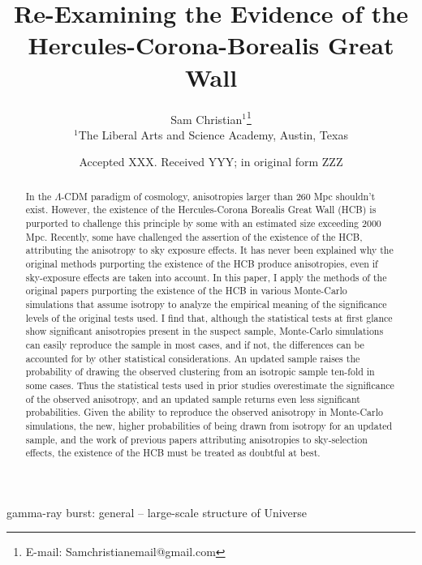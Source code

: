 \documentclass[fleqn,usenatbib]{mnras}
\title[Evidence of the HCB Great Wall]{Re-Examining the Evidence of the Hercules-Corona-Borealis Great Wall}
\author[S. Christian]{
Sam Christian$^{1}$\thanks{E-mail: Samchristianemail@gmail.com}
\\
$^{1}$The Liberal Arts and Science Academy, Austin, Texas\\
}
\date{Accepted XXX. Received YYY; in original form ZZZ}
\begin{document}
\label{firstpage}
\pagerange{\pageref{firstpage}--\pageref{lastpage}}
\maketitle

\begin{abstract}
In the $\Lambda$-CDM paradigm of cosmology, anisotropies larger than 260 Mpc shouldn't exist. However, the existence of the Hercules-Corona Borealis Great Wall (HCB) is purported to challenge this principle by some with an estimated size exceeding 2000 Mpc. Recently, some have challenged the assertion of the existence of the HCB, attributing the anisotropy to sky exposure effects. It has never been explained why the original methods purporting the existence of the HCB produce anisotropies, even if sky-exposure effects are taken into account. In this paper, I apply the methods of the original papers purporting the existence of the HCB in various Monte-Carlo simulations that assume isotropy to analyze the empirical meaning of the significance levels of the original tests used. I find that, although the statistical tests at first glance show significant anisotropies present in the suspect sample, Monte-Carlo simulations can easily reproduce the sample in most cases, and if not, the differences can be accounted for by other statistical considerations. An updated sample raises the probability of drawing the observed clustering from an isotropic sample ten-fold in some cases. Thus the statistical tests used in prior studies overestimate the significance of the observed anisotropy, and an updated sample returns even less significant probabilities. Given the ability to reproduce the observed anisotropy in Monte-Carlo simulations, the new, higher probabilities of being drawn from isotropy for an updated sample, and the work of previous papers attributing anisotropies to sky-selection effects, the existence of the HCB must be treated as doubtful at best.
\end{abstract}

\begin{keywords}
gamma-ray burst: general -- large-scale structure of Universe
\end{keywords}


\end{document}
